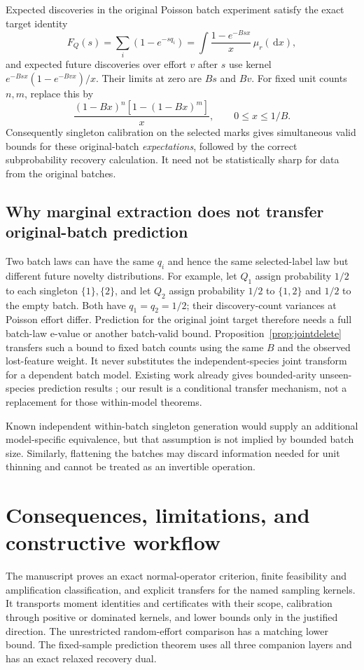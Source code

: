 \documentclass[11pt]{article}
\numberwithin{equation}{section}
\theoremstyle{definition}
\theoremstyle{remark}
\newcommand{\dd}{\,\mathrm d}\newcommand{\norm}[1]{\left\lVert#1\right\rVert}\newcommand{\Scal}{\mathsf S}\newcommand{\Tcal}{\mathsf T}
\begin{document}
Expected discoveries in the original Poisson batch experiment satisfy the exact target identity
\begin{equation}\label{eq:batchtarget}
 F_Q(s)=\sum_i(1-e^{-s q_i})
       =\int\frac{1-e^{-Bs x}}x\,\mu_r(\dd x),
\end{equation}
and expected future discoveries over effort $v$ after $s$ use kernel $e^{-Bs x}(1-e^{-Bv x})/x$. Their limits at zero are $Bs$ and $Bv$. For fixed unit counts $n,m$, replace this by
\[
 \frac{(1-Bx)^n[1-(1-Bx)^m]}x,
 \qquad 0\le x\le1/B.
\]
Consequently singleton calibration on the selected marks gives simultaneous valid bounds for these original-batch \emph{expectations}, followed by the correct subprobability recovery calculation. It need not be statistically sharp for data from the original batches.

\subsection{Why marginal extraction does not transfer original-batch prediction}
Two batch laws can have the same $q_i$ and hence the same selected-label law but different future novelty distributions. For example, let $Q_1$ assign probability $1/2$ to each singleton $\{1\},\{2\}$, and let $Q_2$ assign probability $1/2$ to $\{1,2\}$ and $1/2$ to the empty batch. Both have $q_1=q_2=1/2$; their discovery-count variances at Poisson effort differ. Prediction for the original joint target therefore needs a full batch-law e-value or another batch-valid bound. Proposition~\ref{prop:jointdelete} transfers such a bound to fixed batch counts using the same $B$ and the observed lost-feature weight. It never substitutes the independent-species joint transform for a dependent batch model. Existing work already gives bounded-arity unseen-species prediction results \cite{Eriksson2026}; our result is a conditional transfer mechanism, not a replacement for those within-model theorems.

Known independent within-batch singleton generation would supply an additional model-specific equivalence, but that assumption is not implied by bounded batch size. Similarly, flattening the batches may discard information needed for unit thinning and cannot be treated as an invertible operation.

\section{Consequences, limitations, and constructive workflow}\label{sec:conclusion}
The manuscript proves an exact normal-operator criterion, finite feasibility and amplification classification, and explicit transfers for the named sampling kernels. It transports moment identities and certificates with their scope, calibration through positive or dominated kernels, and lower bounds only in the justified direction. The unrestricted random-effort comparison has a matching lower bound. The fixed-sample prediction theorem uses all three companion layers and has an exact relaxed recovery dual.
\end{document}
